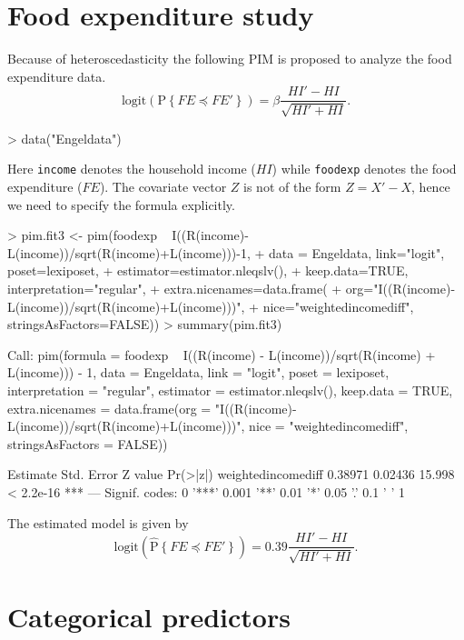 \documentclass[12pt]{article}
\newcommand{\prob}[1]{\text{P}\left\{#1\right\}}
\newcommand{\hatprob}[1]{\hat{\text{P}}\left\{#1\right\}}
\newcommand{\leqs}{\preccurlyeq}
\begin{document}
\section{Food expenditure study}\label{S_fe}

Because of heteroscedasticity the following PIM is proposed to analyze the food expenditure data.
\[
\text{logit}\left( \prob{FE \leqs FE' } \right) = \beta \frac{HI' - HI}{\sqrt{HI' + HI}}.  
\]
\begin{Schunk}
\begin{Sinput}
> data("Engeldata")
\end{Sinput}
\end{Schunk}
Here \verb|income| denotes the household income ($HI$) while \verb|foodexp| denotes the food expenditure ($FE$). The covariate vector $Z$ is not of the form $Z = X' - X$, hence we need to specify the formula explicitly. 
\begin{Schunk}
\begin{Sinput}
> pim.fit3 <- pim(foodexp ~ I((R(income)-L(income))/sqrt(R(income)+L(income)))-1, 
+   data = Engeldata, link="logit", poset=lexiposet, 
+   estimator=estimator.nleqslv(), 
+   keep.data=TRUE, interpretation="regular", 
+   extra.nicenames=data.frame(
+     org="I((R(income)-L(income))/sqrt(R(income)+L(income)))", 
+     nice="weightedincomediff", stringsAsFactors=FALSE))
> summary(pim.fit3)				
\end{Sinput}
\begin{Soutput}
Call:
pim(formula = foodexp ~ I((R(income) - L(income))/sqrt(R(income) + 
    L(income))) - 1, data = Engeldata, link = "logit", poset = lexiposet, 
    interpretation = "regular", estimator = estimator.nleqslv(), 
    keep.data = TRUE, extra.nicenames = data.frame(org = "I((R(income)-L(income))/sqrt(R(income)+L(income)))", 
        nice = "weightedincomediff", stringsAsFactors = FALSE))

                   Estimate Std. Error Z value  Pr(>|z|)    
weightedincomediff  0.38971    0.02436  15.998 < 2.2e-16 ***
---
Signif. codes:  0 '***' 0.001 '**' 0.01 '*' 0.05 '.' 0.1 ' ' 1 
\end{Soutput}
\end{Schunk}
The estimated model is given by 
\[
\text{logit}\left( \hatprob{FE \leqs FE' } \right) =  0.39 \frac{HI' - HI}{\sqrt{HI' + HI}}.  
\]



\section{Categorical predictors}\label{S_categorical}
\end{document}
